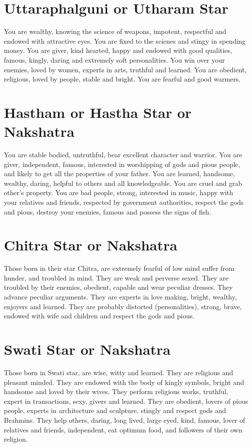 \documentclass[12pt, right open]{memoir}
\begin{document}
\section{Uttaraphalguni or Utharam Star}

You are wealthy, knowing the science of weapons, impotent, respectful and endowed with attractive eyes. You are fixed to the scienes and stingy in spending money. You are giver, kind hearted, happy and endowed with good qualities, famous, kingly, daring and extremely soft personalities. You win over your enemies, loved by women, experts in arts, truthful and learned. You are obedient, religious, loved by people, stable and bright. You are fearful and good warmers.


\section{Hastham or Hastha Star or Nakshatra}

You are stable bodied, untruthful, bear excellent character and warrior. You are giver, independent, famous, interested in worshipping of gods and pious people, and likely to get all the properties of your father. You are learned, handsome, wealthy, daring, helpful to others and all knowledgeable. You are cruel and grab other’s property. You are bad people, strong, interested in music, happy with your relatives and friends, respected by government authorities, respect the gods and pious, destroy your enemies, famous and possess the signs of fish.


\section{Chitra Star or Nakshatra}

Those born in their star Chitra, are extremely fearful of low mind suffer from hunder, and troubled in mind. They are weak and perverse sexed. They are troubled by their enemies, obedient, capable and wear peculiar dresses. They advance peculiar arguments. They are experts in love making, bright, wealthy, enjoyers and learned. They are probably distorted (personalities), strong, brave, endowed with wife and children and respect the gods and pious.


\section{Swati Star or Nakshatra}

Those born in Swati star, are wise, witty and learned. They are religious and pleasant minded. They are endowed with the body of kingly symbols, bright and handsome and loved by their wives. They perform religious works, truthful, expert in transactions, sexy, givers and learned. They are obedient, lovers of pious people, experts in architecture and sculpture, stingly and respect gods and Brahmins. They help others, daring, long lived, large eyed, kind, famous, lover of relatives and friends, independent, eat optimum food, and followers of their own religion.
\end{document}
